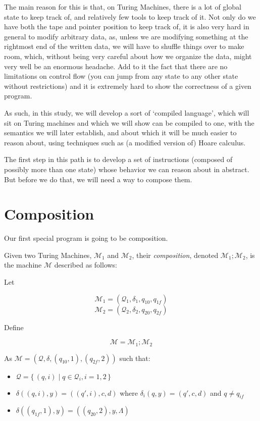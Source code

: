 \documentclass{article}
\newcommand{\M}{\mathcal{M}}
\newcommand{\Q}{\mathcal{Q}}
\begin{document}
	The main reason for this is that, on Turing Machines, there is a lot of global state to keep track of, and relatively few tools to keep track of it. Not only do we have both the tape and pointer position to keep track of, it is also very hard in general to modify arbitrary data, as, unless we are modifying something at the rightmost end of the written data, we will have to shuffle things over to make room, which, without being very careful about how we organize the data, might very well be an enormous headache. Add to it the fact that there are no limitations on control flow (you can jump from any state to any other state without restrictions) and it is extremely hard to show the correctness of a given program.
	
	As such, in this study, we will develop a sort of `compiled language', which will sit on Turing machines and which we will show can be compiled to one, with the semantics we will later establish, and about which it will be much easier to reason about, using techniques such as (a modified version of) Hoare calculus.
	
	The first step in this path is to develop a set of instructions (composed of possibly more than one state) whose behavior we can reason about in abstract. But before we do that, we will need a way to compose them.
	
	\section{Composition}
	Our first special program is going to be composition.
	
	Given two Turing Machines, $\M_1$ and $\M_2$, their \emph{composition}, denoted $\M_1;\M_2$, is the machine $\M$ described as follows:
	
	Let 
	
	\[\M_1 = (\Q_1, \delta_1, q_{10}, q_{1f})\]
	\[\M_2 = (\Q_2, \delta_2, q_{20}, q_{2f})\]
	
	Define
	
	\[ \M = \M_1 ; \M_2 \]
	
	As $\M = (\Q, \delta, (q_{10}, 1), (q_{2f}, 2))$ such that:
	
	\begin{itemize}
	\item $\Q = \{\, (q, i) \mid q \in \Q_i, i = 1,2 \,\}$
	
	\item $\delta((q, i), y) = ((q', i), c, d)$ where $\delta_i(q,y) = (q', c, d)$ and $q \neq q_{if}$
	
	\item $\delta((q_{1f}, 1), y) = ((q_{20}, 2), y, \Lambda)$
	\end{itemize}
	
\end{document}
